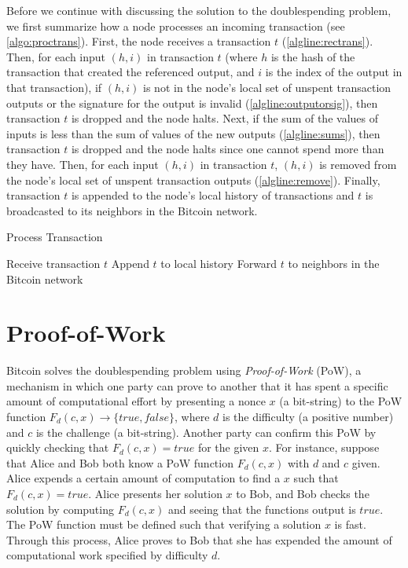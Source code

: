 \documentclass{article}
\begin{document}
Before we continue with discussing the solution to the doublespending problem,
we first summarize how a node processes an incoming transaction (see
\cref{algo:proctrans}). First, the node receives a transaction $t$
(\cref{algline:rectrans}). Then, for each input $(h, i)$ in transaction $t$
(where $h$ is the hash of the transaction that created the referenced output,
and $i$ is the index of the output in that transaction), if $(h, i)$ is not in
the node's local set of unspent transaction outputs or the signature for the
output is invalid (\cref{algline:outputorsig}), then transaction $t$ is dropped
and the node halts. Next, if the sum of the values of inputs is less than the
sum of values of the new outputs (\cref{algline:sums}), then transaction $t$ is
dropped and the node halts since one cannot spend more than they have. Then, for
each input $(h, i)$ in transaction $t$, $(h, i)$ is removed from the node's
local set of unspent transaction outputs (\cref{algline:remove}). Finally,
transaction $t$ is appended to the node's local history of transactions and $t$
is broadcasted to its neighbors in the Bitcoin network.

\begin{algorithm}
  \caption{Process Transaction}\label{algo:proctrans}
  \DontPrintSemicolon%

  Receive transaction $t$\;\label{algline:rectrans}
  Append $t$ to local history\;
  Forward $t$ to neighbors in the Bitcoin network\;
\end{algorithm}

\section{Proof-of-Work}\label{sec:pow}

Bitcoin solves the doublespending problem using \emph{Proof-of-Work} (PoW), a
mechanism in which one party can prove to another that it has spent a specific
amount of computational effort by presenting a nonce $x$ (a bit-string) to the
PoW function $F_d(c,x) \to \{true, false\}$, where $d$ is the difficulty (a
positive number) and $c$ is the challenge (a bit-string). Another party can
confirm this PoW by quickly checking that $F_d(c,x) = true$ for the given $x$.
For instance, suppose that Alice and Bob both know a PoW function $F_d(c,x)$
with $d$ and $c$ given. Alice expends a certain amount of computation to find a
$x$ such that $F_d(c,x) = true$. Alice presents her solution $x$ to Bob, and Bob
checks the solution by computing $F_d(c,x)$ and seeing that the functions output
is $true$. The PoW function must be defined such that verifying a solution $x$
is fast. Through this process, Alice proves to Bob that she has expended the
amount of computational work specified by difficulty $d$.
\end{document}
